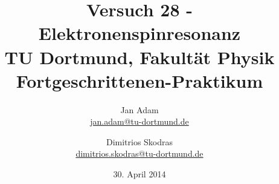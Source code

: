 

\usepackage{multirow}
\usepackage{color}


\title{Versuch 28 - Elektronenspinresonanz\\%
\large TU Dortmund, Fakultät Physik\\ 
\normalsize Fortgeschrittenen-Praktikum}

\author{Jan Adam\\			%
{\small \href{jan.adam@tu-dortmund.de}{jan.adam@tu-dortmund.de}}	%
\and						%
Dimitrios Skodras\\					%
{\small \href{dimitrios.skodras@tu-dortmund.de}{dimitrios.skodras@tu-dortmund.de}}		%
}
\date{30. April 2014}				%





\maketitle					%
\thispagestyle{empty} 				%



\tableofcontents


\newpage					%


